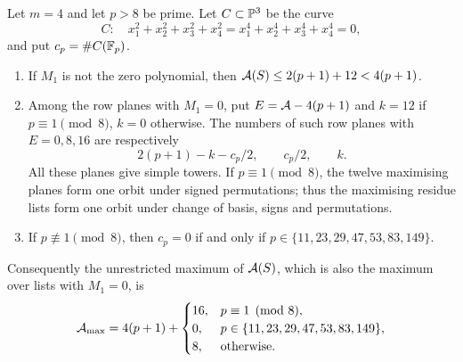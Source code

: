 \begin{theorem}\label{gra:thm:four}
Let $m=4$ and let $p>8$ be prime. Let $C\subset\mathbb{P}^3$ be the curve
\[
 C:\quad x_1^2+x_2^2+x_3^2+x_4^2=x_1^4+x_2^4+x_3^4+x_4^4=0,
\]
and put $c_p=\#C(\mathbb{F}_p)$.
\begin{enumerate}[label=\textup{(\alph*)}]
\item If $M_1$ is not the zero polynomial, then $\mathcal{A}(S)\le2(p+1)+12<4(p+1)$.
\item\label{gra:thm:fourdist} Among the row planes with $M_1=0$, put
$E=\mathcal{A}-4(p+1)$ and $k=12$ if $p\equiv1\pmod8$, $k=0$ otherwise. The
numbers of such row planes with $E=0,8,16$ are respectively
\[
 2(p+1)-k-c_p/2,\qquad c_p/2,\qquad k .
\]
All these planes give simple towers. If $p\equiv1\pmod8$, the twelve
maximising planes form one orbit under signed permutations; thus the
maximising residue lists form one orbit under change of basis, signs and
permutations.
\item If $p\not\equiv1\pmod8$, then $c_p=0$ if and only if
$p\in\{11,23,29,47,53,83,149\}$.
\end{enumerate}
Consequently the unrestricted maximum of $\mathcal{A}(S)$, which is also the
maximum over lists with $M_1=0$, is
\begin{equation}\label{gra:eq:four}
 \mathcal{A}_{\max}=4(p+1)+\begin{cases}
 16,&p\equiv1\pmod8,\\
 0,&p\in\{11,23,29,47,53,83,149\},\\
 8,&\text{otherwise}.\end{cases}
\end{equation}
\end{theorem}

